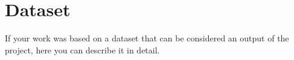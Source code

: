 \chapter{Dataset}
\label{appendiceB}
\thispagestyle{empty}

If your work was based on a dataset that can be considered an output of the project, here you can describe it in detail. 